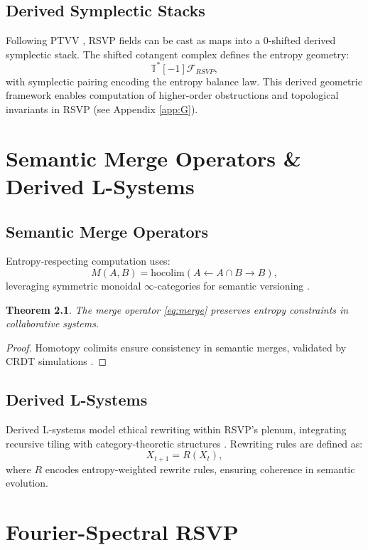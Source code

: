 \documentclass[12pt]{report}
\newtheorem{theorem}{Theorem}[chapter]
\begin{document}
\section{Derived Symplectic Stacks}
Following PTVV \citep{PTVV2013}, RSVP fields can be cast as maps into a 0-shifted derived symplectic stack. The shifted cotangent complex defines the entropy geometry:
\[
\mathbb{T}^*[-1]\mathcal{F}_{RSVP},
\]
with symplectic pairing encoding the entropy balance law. This derived geometric framework enables computation of higher-order obstructions and topological invariants in RSVP (see Appendix \ref{app:G}).

\chapter{Semantic Merge Operators \& Derived L-Systems}
\label{app:S}
\section{Semantic Merge Operators}
Entropy-respecting computation uses:
\begin{equation}
M(A, B) = \mathrm{hocolim}(A \leftarrow A \cap B \to B), \label{eq:merge}
\end{equation}
leveraging symmetric monoidal \(\infty\)-categories for semantic versioning \citep{Lurie2009}.

\begin{theorem}
The merge operator \eqref{eq:merge} preserves entropy constraints in collaborative systems.
\end{theorem}
\begin{proof}
Homotopy colimits ensure consistency in semantic merges, validated by CRDT simulations \citep{Shapiro2011}.
\end{proof}

\section{Derived L-Systems}
Derived L-systems model ethical rewriting within RSVP’s plenum, integrating recursive tiling with category-theoretic structures \citep{RSVPMeta2025}. Rewriting rules are defined as:
\[
X_{t+1} = R(X_t),
\]
where \(R\) encodes entropy-weighted rewrite rules, ensuring coherence in semantic evolution.

\chapter{Fourier-Spectral RSVP}
\label{app:F}
\end{document}
